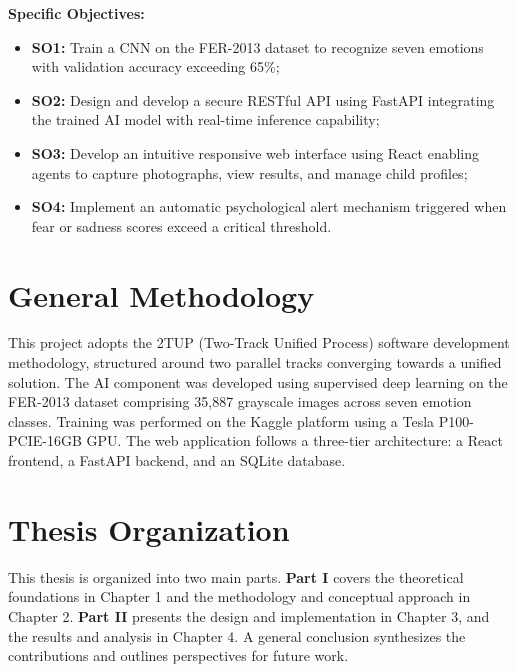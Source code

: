 \documentclass[a4paper,12pt,oneside]{report}
\begin{document}
\noindent\textbf{Specific Objectives:}
\begin{itemize}
    \item \textbf{SO1:} Train a CNN on the FER-2013 dataset to recognize seven
    emotions with validation accuracy exceeding 65\%;
    \item \textbf{SO2:} Design and develop a secure RESTful API using FastAPI
    integrating the trained AI model with real-time inference capability;
    \item \textbf{SO3:} Develop an intuitive responsive web interface using React
    enabling agents to capture photographs, view results, and manage child profiles;
    \item \textbf{SO4:} Implement an automatic psychological alert mechanism
    triggered when fear or sadness scores exceed a critical threshold.
\end{itemize}

\section*{General Methodology}

This project adopts the 2TUP (Two-Track Unified Process) software development
methodology, structured around two parallel tracks converging towards a unified
solution. The AI component was developed using supervised deep learning on the
FER-2013 dataset comprising 35,887 grayscale images across seven emotion classes.
Training was performed on the Kaggle platform using a Tesla P100-PCIE-16GB GPU.
The web application follows a three-tier architecture: a React frontend, a FastAPI
backend, and an SQLite database.

\section*{Thesis Organization}

This thesis is organized into two main parts. \textbf{Part I} covers the
theoretical foundations in Chapter 1 and the methodology and conceptual approach
in Chapter 2. \textbf{Part II} presents the design and implementation in Chapter
3, and the results and analysis in Chapter 4. A general conclusion synthesizes
the contributions and outlines perspectives for future work.

\clearpage

\end{document}
